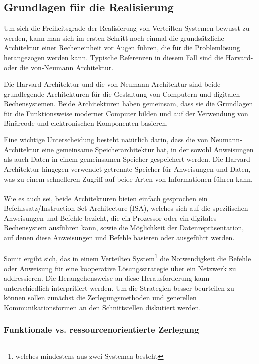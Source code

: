\subsection{Grundlagen für die Realisierung}

Um sich die Freiheitsgrade der Realisierung von Verteilten Systemen bewusst zu werden, kann man sich im ersten Schritt noch einmal die grundsätzliche Architektur einer Recheneinheit vor Augen führen, die für die Problemlösung herangezogen werden kann. Typische Referenzen in diesem Fall sind die Harvard- oder die von-Neumann Architektur. 

Die Harvard-Architektur und die von-Neumann-Architektur sind beide grundlegende Architekturen für die Gestaltung von Computern und digitalen Rechensystemen. Beide Architekturen haben gemeinsam, dass sie die Grundlagen für die Funktionsweise moderner Computer bilden und auf der Verwendung von Binärcode und elektronischen Komponenten basieren.

Eine wichtige Unterscheidung besteht natürlich darin, dass die von Neumann-Architektur eine gemeinsame Speicherarchitektur hat, in der sowohl Anweisungen als auch Daten in einem gemeinsamen Speicher gespeichert werden. Die Harvard-Architektur hingegen verwendet getrennte Speicher für Anweisungen und Daten, was zu einem schnelleren Zugriff auf beide Arten von Informationen führen kann.
\\\\
Wie es auch sei,  beide Architekturen bieten einfach gesprochen ein Befehlssatz/Instruction Set Architecture (ISA), welches sich auf die spezifischen Anweisungen und Befehle bezieht, die ein Prozessor oder ein digitales Rechensystem ausführen kann, sowie die Möglichkeit der Datenrepräsentation, auf denen diese Anweisungen und Befehle basieren oder ausgeführt werden.
\\\\
Somit ergibt sich, das in einem Verteilten System\footnote{welches mindestens aus zwei Systemen besteht} die Notwendigkeit die Befehle oder Anweisung für eine kooperative Lösungsstrategie über ein Netzwerk zu addressieren. Die Herangehensweise an diese Herausforderung kann unterschiedlich interpritiert werden. Um die Strategien besser beurteilen zu können sollen zunächst die Zerlegungsmethoden und generellen Kommunikationsformen an den Schnittstellen diskutiert werden. 

\subsubsection{Funktionale vs. ressourcenorientierte Zerlegung}

